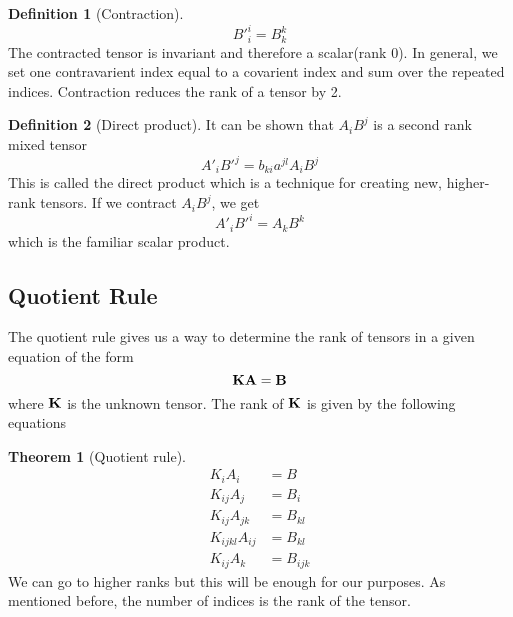 \documentclass[10pt, a4paper]{extarticle}
\theoremstyle{definition}
\newtheorem{thm}{Theorem}
\newtheorem{defn}{Definition}
\numberwithin{equation}{subsection}
\begin{document}
\begin{framed}
	\begin{defn}[Contraction]
		\begin{equation}
			B'^i_i=B^k_k
		\end{equation}
		The contracted tensor is invariant and therefore a scalar(rank 0). In general, we set one contravarient index equal to a covarient index and sum over the repeated indices. Contraction reduces the rank of a tensor by 2.
	\end{defn}
	\begin{defn}[Direct product]
		It can be shown that $A_iB^j$ is a second rank mixed tensor
		\begin{equation}
			A'_iB'^j=b_{ki}a^{jl}A_iB^j
		\end{equation}
		This is called the direct product which is a technique for creating new, higher-rank tensors.
		If we contract $A_iB^j$, we get \[A'_iB'^i=A_kB^k\] which is the familiar scalar product.
	\end{defn}
\end{framed}
\subsection{Quotient Rule}
The quotient rule gives us a way to determine the rank of tensors in a given equation of the form
\[\vb{KA}=\vb{B}\]
where $\vb{K}$ is the unknown tensor. The rank of $\vb{K}$ is given by the following equations
\begin{framed}
	\begin{thm}[Quotient rule]
		\begin{align}
			K_iA_i&=B\\
			K_{ij}A_j&=B_i\\
			K_{ij}A_{jk}&=B_{kl}\\
			K_{ijkl}A_{ij}&=B_{kl}\\
			K_{ij}A_{k}&=B_{ijk}
		\end{align}
		We can go to higher ranks but this will be enough for our purposes. As mentioned before, the number of indices is the rank of the tensor.
	\end{thm}
\end{framed}
\end{document}

